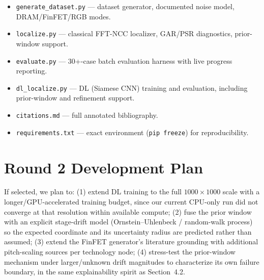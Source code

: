 \documentclass[11pt]{article}
\begin{document}
\begin{itemize}
  \item \texttt{generate\_dataset.py} --- dataset generator, documented
    noise model, DRAM/FinFET/RGB modes.
  \item \texttt{localize.py} --- classical FFT-NCC localizer, GAR/PSR
    diagnostics, prior-window support.
  \item \texttt{evaluate.py} --- 30+-case batch evaluation harness with
    live progress reporting.
  \item \texttt{dl\_localize.py} --- DL (Siamese CNN) training and
    evaluation, including prior-window and refinement support.
  \item \texttt{citations.md} --- full annotated bibliography.
  \item \texttt{requirements.txt} --- exact environment (\texttt{pip
    freeze}) for reproducibility.
\end{itemize}

\section{Round 2 Development Plan}

If selected, we plan to: (1) extend DL training to the full $1000\times
1000$ scale with a longer/GPU-accelerated training budget, since our
current CPU-only run did not converge at that resolution within available
compute; (2) fuse the prior window with an explicit stage-drift model
(Ornstein--Uhlenbeck / random-walk process) so the expected coordinate and
its uncertainty radius are predicted rather than assumed; (3) extend the
FinFET generator's literature grounding with additional pitch-scaling
sources per technology node; (4) stress-test the prior-window mechanism
under larger/unknown drift magnitudes to characterize its own failure
boundary, in the same explainability spirit as Section~4.2.
\end{document}
